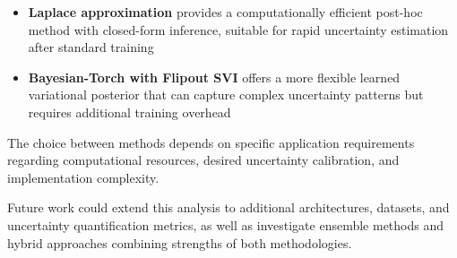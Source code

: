 \documentclass[11pt]{article}
\begin{document}
\begin{itemize}
    \item \textbf{Laplace approximation} provides a computationally efficient post-hoc method with closed-form inference, suitable for rapid uncertainty estimation after standard training
    \item \textbf{Bayesian-Torch with Flipout SVI} offers a more flexible learned variational posterior that can capture complex uncertainty patterns but requires additional training overhead
\end{itemize}

The choice between methods depends on specific application requirements regarding computational resources, desired uncertainty calibration, and implementation complexity.

Future work could extend this analysis to additional architectures, datasets, and uncertainty quantification metrics, as well as investigate ensemble methods and hybrid approaches combining strengths of both methodologies.
\end{document}
